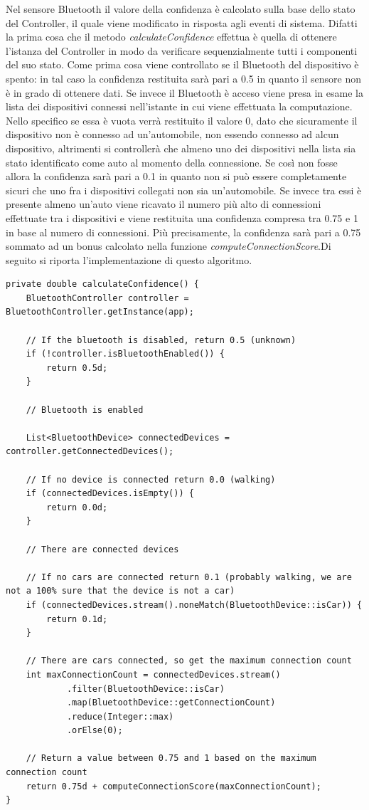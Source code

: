 Nel sensore Bluetooth il valore della confidenza è calcolato sulla base dello stato del Controller, il quale viene modificato in risposta agli eventi di sistema. Difatti la prima cosa che il metodo \textit{calculateConfidence} effettua è quella di ottenere l'istanza del Controller in modo da verificare sequenzialmente tutti i componenti del suo stato. Come prima cosa viene controllato se il Bluetooth del dispositivo è spento: in tal caso la confidenza restituita sarà pari a 0.5 in quanto il sensore non è in grado di ottenere dati. Se invece il Bluetooth è acceso viene presa in esame la lista dei dispositivi connessi nell'istante in cui viene effettuata la computazione. Nello specifico se essa è vuota verrà restituito il valore 0, dato che sicuramente il dispositivo non è connesso ad un'automobile, non essendo connesso ad alcun dispositivo, altrimenti si controllerà che almeno uno dei dispositivi nella lista sia stato identificato come auto al momento della connessione. Se così non fosse allora la confidenza sarà pari a 0.1 in quanto non si può essere completamente sicuri che uno fra i dispositivi collegati non sia un'automobile. Se invece tra essi è presente almeno un'auto viene ricavato il numero più alto di connessioni effettuate tra i dispositivi e viene restituita una confidenza compresa tra 0.75 e 1 in base al numero di connessioni. Più precisamente, la confidenza sarà pari a 0.75 sommato ad un bonus calcolato nella funzione \textit{computeConnectionScore}.Di seguito si riporta l'implementazione di questo algoritmo.

\begin{verbatim}
private double calculateConfidence() {
    BluetoothController controller = BluetoothController.getInstance(app);

    // If the bluetooth is disabled, return 0.5 (unknown)
    if (!controller.isBluetoothEnabled()) {
        return 0.5d;
    }

    // Bluetooth is enabled

    List<BluetoothDevice> connectedDevices = controller.getConnectedDevices();

    // If no device is connected return 0.0 (walking)
    if (connectedDevices.isEmpty()) {
        return 0.0d;
    }

    // There are connected devices

    // If no cars are connected return 0.1 (probably walking, we are not a 100% sure that the device is not a car)
    if (connectedDevices.stream().noneMatch(BluetoothDevice::isCar)) {
        return 0.1d;
    }

    // There are cars connected, so get the maximum connection count
    int maxConnectionCount = connectedDevices.stream()
            .filter(BluetoothDevice::isCar)
            .map(BluetoothDevice::getConnectionCount)
            .reduce(Integer::max)
            .orElse(0);

    // Return a value between 0.75 and 1 based on the maximum connection count
    return 0.75d + computeConnectionScore(maxConnectionCount);
}
\end{verbatim}

